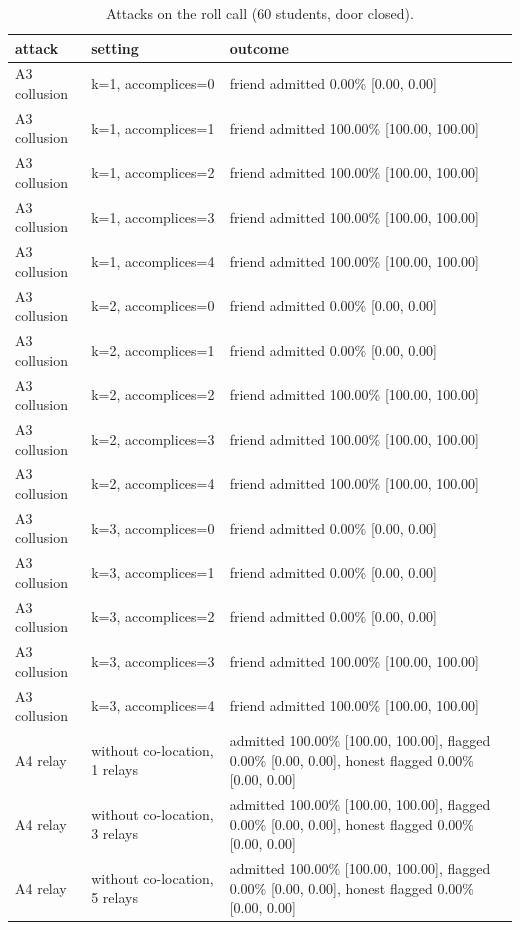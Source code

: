 \begin{table}[t]
\centering
\caption{Attacks on the roll call (60 students, door closed).}\label{tab:e03}
\begin{tabular}{lll}
\toprule
attack & setting & outcome \\
\midrule
A3 collusion & k=1, accomplices=0 & friend admitted 0.00\% [0.00, 0.00] \\
A3 collusion & k=1, accomplices=1 & friend admitted 100.00\% [100.00, 100.00] \\
A3 collusion & k=1, accomplices=2 & friend admitted 100.00\% [100.00, 100.00] \\
A3 collusion & k=1, accomplices=3 & friend admitted 100.00\% [100.00, 100.00] \\
A3 collusion & k=1, accomplices=4 & friend admitted 100.00\% [100.00, 100.00] \\
A3 collusion & k=2, accomplices=0 & friend admitted 0.00\% [0.00, 0.00] \\
A3 collusion & k=2, accomplices=1 & friend admitted 0.00\% [0.00, 0.00] \\
A3 collusion & k=2, accomplices=2 & friend admitted 100.00\% [100.00, 100.00] \\
A3 collusion & k=2, accomplices=3 & friend admitted 100.00\% [100.00, 100.00] \\
A3 collusion & k=2, accomplices=4 & friend admitted 100.00\% [100.00, 100.00] \\
A3 collusion & k=3, accomplices=0 & friend admitted 0.00\% [0.00, 0.00] \\
A3 collusion & k=3, accomplices=1 & friend admitted 0.00\% [0.00, 0.00] \\
A3 collusion & k=3, accomplices=2 & friend admitted 0.00\% [0.00, 0.00] \\
A3 collusion & k=3, accomplices=3 & friend admitted 100.00\% [100.00, 100.00] \\
A3 collusion & k=3, accomplices=4 & friend admitted 100.00\% [100.00, 100.00] \\
A4 relay & without co-location, 1 relays & admitted 100.00\% [100.00, 100.00], flagged 0.00\% [0.00, 0.00], honest flagged 0.00\% [0.00, 0.00] \\
A4 relay & without co-location, 3 relays & admitted 100.00\% [100.00, 100.00], flagged 0.00\% [0.00, 0.00], honest flagged 0.00\% [0.00, 0.00] \\
A4 relay & without co-location, 5 relays & admitted 100.00\% [100.00, 100.00], flagged 0.00\% [0.00, 0.00], honest flagged 0.00\% [0.00, 0.00] \\

\end{tabular}
\end{table}
